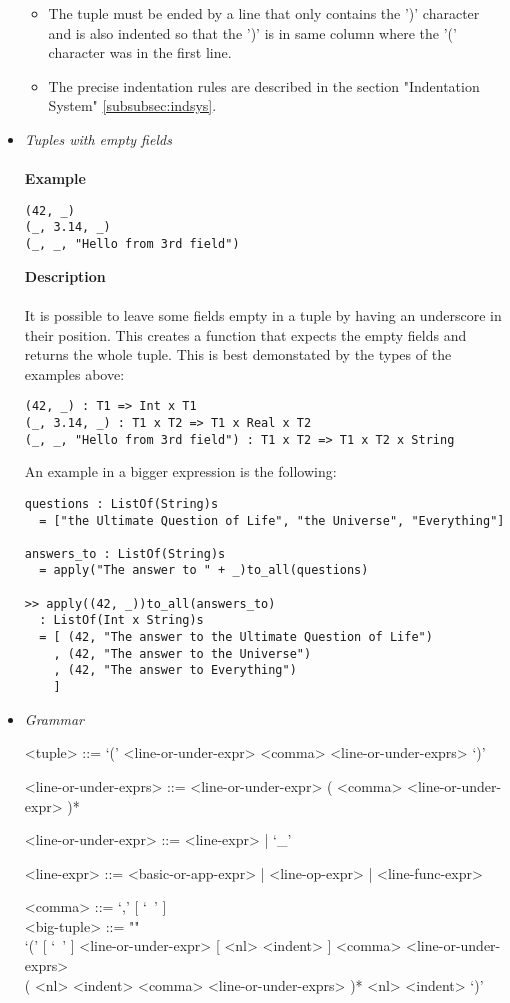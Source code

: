 \documentclass{article}
\begin{document}
\begin{itemize}
\begin{itemize}
\item
The tuple must be ended by a line that only contains the ')' character and is 
also indented so that the ')' is in same column where the '(' character was in
the first line.

\item
The precise indentation rules are described in the section
"Indentation System" \ref{subsubsec:indsys}.
\end{itemize}

\item \textit{Tuples with empty fields}
\\\\
\textbf{Example}
\begin{verbatim}
(42, _)
(_, 3.14, _)
(_, _, "Hello from 3rd field")
\end{verbatim}

\textbf{Description}\\\\
It is possible to leave some fields empty in a tuple by having an underscore in
their position. This creates a function that expects the empty fields
and returns the whole tuple. This is best demonstated by the types of the
examples above:
\begin{verbatim}
(42, _) : T1 => Int x T1
(_, 3.14, _) : T1 x T2 => T1 x Real x T2
(_, _, "Hello from 3rd field") : T1 x T2 => T1 x T2 x String
\end{verbatim}
An example in a bigger expression is the following:
\begin{verbatim}
questions : ListOf(String)s
  = ["the Ultimate Question of Life", "the Universe", "Everything"]

answers_to : ListOf(String)s
  = apply("The answer to " + _)to_all(questions)

>> apply((42, _))to_all(answers_to)
  : ListOf(Int x String)s
  = [ (42, "The answer to the Ultimate Question of Life")
    , (42, "The answer to the Universe")
    , (42, "The answer to Everything")
    ]
\end{verbatim}

\item \textit{Grammar}
\begin{grammar}
<tuple> ::= `(' <line-or-under-expr> <comma> <line-or-under-exprs> `)'

<line-or-under-exprs> ::= <line-or-under-expr> ( <comma> <line-or-under-expr> )*

<line-or-under-expr> ::= <line-expr> | `_'

<line-expr> ::= <basic-or-app-expr> | <line-op-expr> | <line-func-expr>

<comma> ::= `,' [ `\ ' ]
\\

<big-tuple> ::= ""\\
`(' [ `\ ' ] <line-or-under-expr> [ <nl> <indent> ]
<comma> <line-or-under-exprs> \\
( <nl> <indent> <comma> <line-or-under-exprs> )* 
<nl> <indent> `)'
\end{grammar}

\end{itemize}
\end{document}
